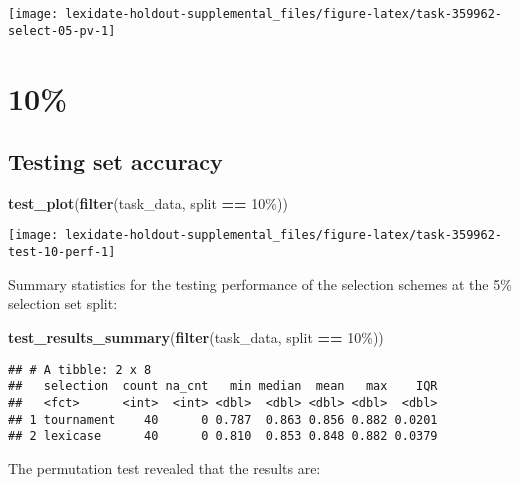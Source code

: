 \documentclass[
]{book}
\newenvironment{Shaded}{\begin{snugshade}}{\end{snugshade}}
\newcommand{\FunctionTok}[1]{\textcolor[rgb]{0.13,0.29,0.53}{\textbf{#1}}}
\newcommand{\NormalTok}[1]{#1}
\newcommand{\SpecialCharTok}[1]{\textcolor[rgb]{0.81,0.36,0.00}{\textbf{#1}}}
\newcommand{\StringTok}[1]{\textcolor[rgb]{0.31,0.60,0.02}{#1}}
\begin{document}
\texttt{[image: lexidate-holdout-supplemental\_files/figure-latex/task-359962-select-05-pv-1]}

\hypertarget{section-56}{%
\section{10\%}\label{section-56}}

\hypertarget{testing-set-accuracy-56}{%
\subsection{Testing set accuracy}\label{testing-set-accuracy-56}}

\begin{Shaded}
\begin{Highlighting}[]
\FunctionTok{test\_plot}\NormalTok{(}\FunctionTok{filter}\NormalTok{(task\_data, split }\SpecialCharTok{==} \StringTok{\textquotesingle{}10\%\textquotesingle{}}\NormalTok{))}
\end{Highlighting}
\end{Shaded}

\texttt{[image: lexidate-holdout-supplemental\_files/figure-latex/task-359962-test-10-perf-1]}

Summary statistics for the testing performance of the selection schemes at the 5\% selection set split:

\begin{Shaded}
\begin{Highlighting}[]
\FunctionTok{test\_results\_summary}\NormalTok{(}\FunctionTok{filter}\NormalTok{(task\_data, split }\SpecialCharTok{==} \StringTok{\textquotesingle{}10\%\textquotesingle{}}\NormalTok{))}
\end{Highlighting}
\end{Shaded}

\begin{verbatim}
## # A tibble: 2 x 8
##   selection  count na_cnt   min median  mean   max    IQR
##   <fct>      <int>  <int> <dbl>  <dbl> <dbl> <dbl>  <dbl>
## 1 tournament    40      0 0.787  0.863 0.856 0.882 0.0201
## 2 lexicase      40      0 0.810  0.853 0.848 0.882 0.0379
\end{verbatim}

The permutation test revealed that the results are:
\end{document}

